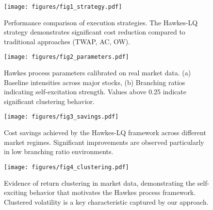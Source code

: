 

\begin{figure}[htbp]
    \centering
    \texttt{[image: figures/fig1\_strategy.pdf]}
    \caption{Performance comparison of execution strategies. The Hawkes-LQ strategy demonstrates significant cost reduction compared to traditional approaches (TWAP, AC, OW).}
    \label{fig:strategy_comparison}
\end{figure}

\begin{figure}[htbp]
    \centering
    \texttt{[image: figures/fig2\_parameters.pdf]}
    \caption{Hawkes process parameters calibrated on real market data. (a) Baseline intensities across major stocks, (b) Branching ratios indicating self-excitation strength. Values above 0.25 indicate significant clustering behavior.}
    \label{fig:parameters}
\end{figure}

\begin{figure}[htbp]
    \centering
    \texttt{[image: figures/fig3\_savings.pdf]}
    \caption{Cost savings achieved by the Hawkes-LQ framework across different market regimes. Significant improvements are observed particularly in low branching ratio environments.}
    \label{fig:savings}
\end{figure}

\begin{figure}[htbp]
    \centering
    \texttt{[image: figures/fig4\_clustering.pdf]}
    \caption{Evidence of return clustering in market data, demonstrating the self-exciting behavior that motivates the Hawkes process framework. Clustered volatility is a key characteristic captured by our approach.}
    \label{fig:clustering}
\end{figure}
